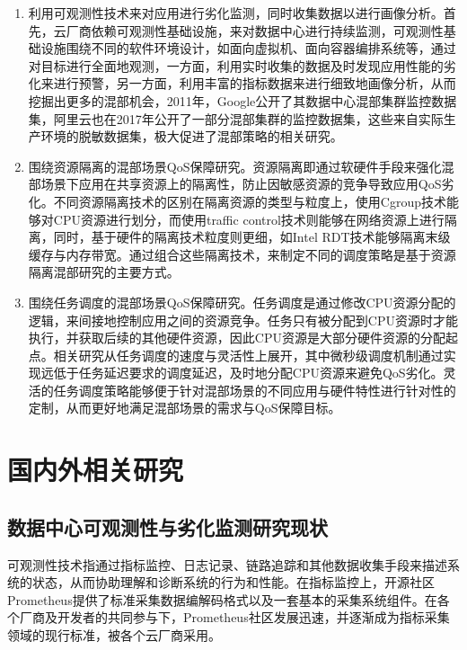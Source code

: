 \begin{enumerate}
    \item 利用可观测性技术来对应用进行劣化监测，同时收集数据以进行画像分析。首先，云厂商依赖可观测性基础设施，来对数据中心进行持续监测，可观测性基础设施围绕不同的软件环境设计，如面向虚拟机、面向容器编排系统等，通过对目标进行全面地观测，一方面，利用实时收集的数据及时发现应用性能的劣化来进行预警，另一方面，利用丰富的指标数据来进行细致地画像分析，从而挖掘出更多的混部机会，2011年，Google公开了其数据中心混部集群监控数据集，阿里云也在2017年公开了一部分混部集群的监控数据集\citep{guo2019limits}，这些来自实际生产环境的脱敏数据集，极大促进了混部策略的相关研究。
    \item 围绕资源隔离的混部场景QoS保障研究。资源隔离即通过软硬件手段来强化混部场景下应用在共享资源上的隔离性，防止因敏感资源的竞争导致应用QoS劣化。不同资源隔离技术的区别在隔离资源的类型与粒度上，使用Cgroup技术能够对CPU资源进行划分，而使用traffic control技术\citep{hubert2002linux}则能够在网络资源上进行隔离，同时，基于硬件的隔离技术粒度则更细，如Intel RDT技术\citep{guide2011intel}能够隔离末级缓存与内存带宽。通过组合这些隔离技术，来制定不同的调度策略是基于资源隔离混部研究的主要方式。
    \item 围绕任务调度的混部场景QoS保障研究。任务调度是通过修改CPU资源分配的逻辑，来间接地控制应用之间的资源竞争。任务只有被分配到CPU资源时才能执行，并获取后续的其他硬件资源，因此CPU资源是大部分硬件资源的分配起点。相关研究从任务调度的速度与灵活性上展开，其中微秒级调度机制通过实现远低于任务延迟要求的调度延迟，及时地分配CPU资源来避免QoS劣化。灵活的任务调度策略能够便于针对混部场景的不同应用与硬件特性进行针对性的定制，从而更好地满足混部场景的需求与QoS保障目标。
\end{enumerate}

\section{国内外相关研究}

\subsection{数据中心可观测性与劣化监测研究现状}


可观测性技术指通过指标监控、日志记录、链路追踪和其他数据收集手段来描述系统的状态，从而协助理解和诊断系统的行为和性能。在指标监控上，开源社区Prometheus\citep{brazil2018prometheus}提供了标准采集数据编解码格式以及一套基本的采集系统组件。在各个厂商及开发者的共同参与下，Prometheus社区发展迅速，并逐渐成为指标采集领域的现行标准，被各个云厂商采用。

